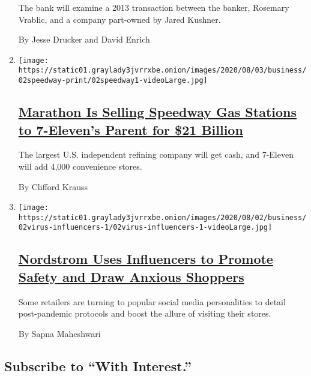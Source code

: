 \begin{enumerate}
  The bank will examine a 2013 transaction between the banker, Rosemary
  Vrablic, and a company part-owned by Jared Kushner.

  By Jesse Drucker and David Enrich
\item
  \texttt{[image: https://static01.graylady3jvrrxbe.onion/images/2020/08/03/business/02speedway-print/02speedway1-videoLarge.jpg]}

  \hypertarget{marathon-is-selling-speedway-gas-stations-to-7-elevens-parent-for-21-billion}{%
  \subsection{\texorpdfstring{\href{/2020/08/02/business/marathon-petroleum-speedway-7-11.html}{Marathon
  Is Selling Speedway Gas Stations to 7-Eleven's Parent for \$21
  Billion}}{Marathon Is Selling Speedway Gas Stations to 7-Eleven's Parent for \$21 Billion}}\label{marathon-is-selling-speedway-gas-stations-to-7-elevens-parent-for-21-billion}}

  The largest U.S. independent refining company will get cash, and
  7-Eleven will add 4,000 convenience stores.

  By Clifford Krauss
\item
  \texttt{[image: https://static01.graylady3jvrrxbe.onion/images/2020/08/02/business/02virus-influencers-1/02virus-influencers-1-videoLarge.jpg]}

  \hypertarget{nordstrom-uses-influencers-to-promote-safety-and-draw-anxious-shoppers}{%
  \subsection{\texorpdfstring{\href{/2020/08/02/business/media/coronavirus-nordstrom-infuencers.html}{Nordstrom
  Uses Influencers to Promote Safety and Draw Anxious
  Shoppers}}{Nordstrom Uses Influencers to Promote Safety and Draw Anxious Shoppers}}\label{nordstrom-uses-influencers-to-promote-safety-and-draw-anxious-shoppers}}

  Some retailers are turning to popular social media personalities to
  detail post-pandemic protocols and boost the allure of visiting their
  stores.

  By Sapna Maheshwari
\end{enumerate}

\hypertarget{subscribe-to-with-interest}{%
\subsection{Subscribe to ``With
Interest.''}\label{subscribe-to-with-interest}}

